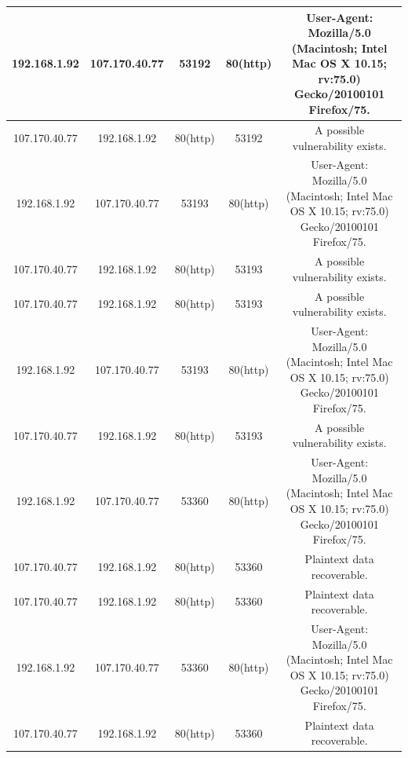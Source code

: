 \documentclass{article}
\begin{document}
\begin{center}
\begin{tabular}{||c c c c c||}
\hline
192.168.1.92 & 107.170.40.77 & 53192 & 80(http) & \multicolumn{1}{m{3cm}|}{User-Agent: Mozilla/5.0 (Macintosh; Intel Mac OS X 10.15; rv:75.0) Gecko/20100101 Firefox/75.}\\
\hline
107.170.40.77 & 192.168.1.92 & 80(http) & 53192 & \multicolumn{1}{m{3cm}|}{A possible vulnerability exists.}\\
\hline
192.168.1.92 & 107.170.40.77 & 53193 & 80(http) & \multicolumn{1}{m{3cm}|}{User-Agent: Mozilla/5.0 (Macintosh; Intel Mac OS X 10.15; rv:75.0) Gecko/20100101 Firefox/75.}\\
\hline
107.170.40.77 & 192.168.1.92 & 80(http) & 53193 & \multicolumn{1}{m{3cm}|}{A possible vulnerability exists.}\\
\hline
107.170.40.77 & 192.168.1.92 & 80(http) & 53193 & \multicolumn{1}{m{3cm}|}{A possible vulnerability exists.}\\
\hline
192.168.1.92 & 107.170.40.77 & 53193 & 80(http) & \multicolumn{1}{m{3cm}|}{User-Agent: Mozilla/5.0 (Macintosh; Intel Mac OS X 10.15; rv:75.0) Gecko/20100101 Firefox/75.}\\
\hline
107.170.40.77 & 192.168.1.92 & 80(http) & 53193 & \multicolumn{1}{m{3cm}|}{A possible vulnerability exists.}\\
\hline
192.168.1.92 & 107.170.40.77 & 53360 & 80(http) & \multicolumn{1}{m{3cm}|}{User-Agent: Mozilla/5.0 (Macintosh; Intel Mac OS X 10.15; rv:75.0) Gecko/20100101 Firefox/75.}\\
\hline
107.170.40.77 & 192.168.1.92 & 80(http) & 53360 & \multicolumn{1}{m{3cm}|}{Plaintext data recoverable.}\\
\hline
107.170.40.77 & 192.168.1.92 & 80(http) & 53360 & \multicolumn{1}{m{3cm}|}{Plaintext data recoverable.}\\
\hline
192.168.1.92 & 107.170.40.77 & 53360 & 80(http) & \multicolumn{1}{m{3cm}|}{User-Agent: Mozilla/5.0 (Macintosh; Intel Mac OS X 10.15; rv:75.0) Gecko/20100101 Firefox/75.}\\
\hline
107.170.40.77 & 192.168.1.92 & 80(http) & 53360 & \multicolumn{1}{m{3cm}|}{Plaintext data recoverable.}\\
\hline
\end{tabular}
\end{center}
\end{document}
